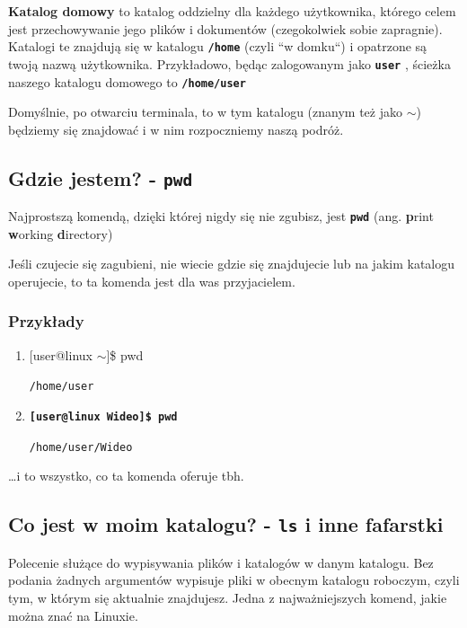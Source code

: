 \documentclass[12pt]{article}
\makeatletter
\newcommand{\ttbf}[1]{
    \texttt{\textbf{#1}}
}
\newenvironment{console1}
{
    \ttfamily
    \fontseries{b}
    \selectfont
    {[}user@linux $\sim${]}\$} {

    }
\makeatother
\begin{document}
\textbf{Katalog domowy} to katalog oddzielny dla każdego użytkownika, którego celem jest przechowywanie jego plików i dokumentów (czegokolwiek sobie zapragnie). Katalogi te znajdują się w katalogu \ttbf{/home} (czyli ``w domku``) i opatrzone są twoją nazwą użytkownika. Przykładowo, będąc zalogowanym jako \ttbf{user}, ścieżka naszego katalogu domowego to \ttbf{/home/user}

Domyślnie, po otwarciu terminala, to w tym katalogu (znanym też jako $\sim$) będziemy się znajdować i w nim rozpoczniemy naszą podróż.

\subsection{Gdzie jestem? - \ttbf{pwd}}

Najprostszą komendą, dzięki której nigdy się nie zgubisz, jest \ttbf{pwd} (ang. \textbf{p}rint \textbf{w}orking \textbf{d}irectory)

Jeśli czujecie się zagubieni, nie wiecie gdzie się znajdujecie lub na jakim katalogu operujecie, to ta komenda jest dla was przyjacielem.

\subsubsection{Przykłady}

\begin{enumerate}
    \item \begin{console1}
        pwd
    \end{console1}
    
    \texttt{/home/user}

    \item \ttbf{[user@linux Wideo]\$ pwd}

    \texttt{/home/user/Wideo}
\end{enumerate}

\dots i to wszystko, co ta komenda oferuje tbh.

\subsection{Co jest w moim katalogu? - \ttbf{ls} i inne fafarstki}
\label{sec:ls}

Polecenie służące do wypisywania plików i katalogów w danym katalogu. Bez podania żadnych argumentów wypisuje pliki w obecnym katalogu roboczym, czyli tym, w którym się aktualnie znajdujesz. Jedna z najważniejszych komend, jakie można znać na Linuxie.
\end{document}

